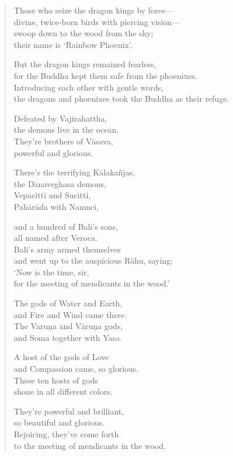 \documentclass[12pt,openany]{book}%
\begin{document}
\begin{verse}
Those who seize the dragon kings by force—\\
divine, twice-born birds with piercing vision—\\
swoop down to the wood from the sky; \\
their name is ‘Rainbow Phoenix’. 

But the dragon kings remained fearless, \\
for the Buddha kept them safe from the phoenixes. \\
Introducing each other with gentle words, \\
the dragons and phoenixes took the Buddha as their refuge. 

Defeated by Vajirahattha, \\
the demons live in the ocean. \\
They’re brothers of \textsanskrit{Vāsava}, \\
powerful and glorious. 

There’s the terrifying \textsanskrit{Kālakañjas}, \\
the \textsanskrit{Dānaveghasa} demons, \\
Vepacitti and Sucitti, \\
\textsanskrit{Pahārāda} with Namuci, 

and a hundred of Bali’s sons, \\
all named after Veroca. \\
Bali’s army armed themselves \\
and went up to the auspicious \textsanskrit{Rāhu}, saying: \\
‘Now is the time, sir, \\
for the meeting of mendicants in the wood.’ 

The gods of Water and Earth, \\
and Fire and Wind came there. \\
The \textsanskrit{Varuṇa} and \textsanskrit{Vāruṇa} gods, \\
and Soma together with Yasa. 

A host of the gods of Love \\
and Compassion came, so glorious. \\
These ten hosts of gods \\
shone in all different colors. 

They’re powerful and brilliant, \\
so beautiful and glorious. \\
Rejoicing, they’ve come forth \\
to the meeting of mendicants in the wood. 


\end{verse}
\end{document}
